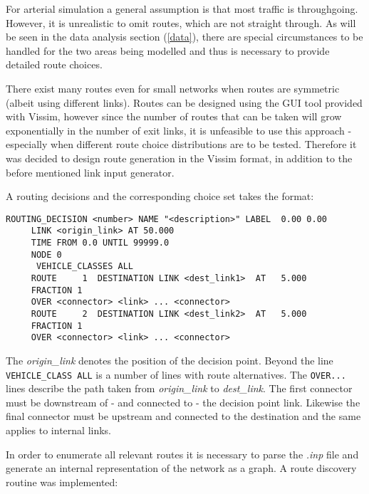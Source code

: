 \documentclass[10pt,a4paper]{article}
\begin{document}
For arterial simulation a general assumption is that most traffic is throughgoing. However, it is unrealistic to omit routes, which are not straight through. As will be seen in the data analysis section (\ref{data}), there are special circumstances to be handled for the two areas being modelled and thus is necessary to provide detailed route choices.

There exist many routes even for small networks when routes are symmetric (albeit using different links). Routes can be designed using the GUI tool provided with Vissim, however since the number of routes that can be taken will grow exponentially in the number of exit links, it is unfeasible to use this approach - especially when different route choice distributions are to be tested. Therefore it was decided to design route generation in the Vissim format, in addition to the before mentioned link input generator.

A routing decisions and the corresponding choice set takes the format:

\begin{verbatim}
ROUTING_DECISION <number> NAME "<description>" LABEL  0.00 0.00
     LINK <origin_link> AT 50.000
     TIME FROM 0.0 UNTIL 99999.0
     NODE 0
      VEHICLE_CLASSES ALL
     ROUTE     1  DESTINATION LINK <dest_link1>  AT   5.000
     FRACTION 1
     OVER <connector> <link> ... <connector>
     ROUTE     2  DESTINATION LINK <dest_link2>  AT   5.000
     FRACTION 1
     OVER <connector> <link> ... <connector>
\end{verbatim}

The \textit{origin_link} denotes the position of the decision point. Beyond the line \verb|VEHICLE_CLASS ALL| is a number of lines with route alternatives. The \verb|OVER...| lines describe the path taken from \textit{origin_link} to \textit{dest_link}. The first connector must be downstream of - and connected to - the decision point link. Likewise the final connector must be upstream and connected to the destination and the same applies to internal links.

In order to enumerate all relevant routes it is necessary to parse the \textit{.inp} file and generate an internal representation of the network as a graph. A route discovery routine was implemented:
\end{document}
